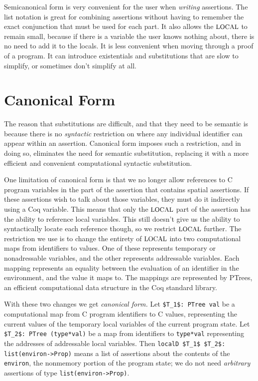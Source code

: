 \documentclass{puthesis}
\begin{document}
Semicanonical form is very convenient for the user when
\emph{writing} assertions. The list notation is great for combining
assertions without having to remember the exact conjunction that must
be used for each part. It also allows the $\mbox{\small LOCAL}$ to remain small,
because if there is a variable the user knows nothing about, there is
no need to add it to the locals. It is less convenient when moving
through a proof of a program. It can introduce existentials and
substitutions that are slow to simplify, or sometimes don't simplify
at all.


\section{Canonical Form}
\label{sec:cform}
The reason that substitutions are difficult, and that they need to be
semantic is because there is no \emph{syntactic} restriction on where
any individual identifier can appear within an assertion.  Canonical
form imposes such a restriction, and in doing so, eliminates the need
for semantic substitution, replacing it with a more efficient and
convenient computational syntactic substitution.

One limitation of canonical form is that we no longer allow references
to C program variables in the part of the assertion that contains
spatial assertions. If these assertions wish to talk about those
variables, they must do it indirectly using a Coq variable.  This
means that only the $\mbox{\small LOCAL}$ part of the assertion has the ability to
reference local variables. This still doesn't give us the ability to
syntactically locate each reference though, so we restrict $\mbox{\small LOCAL}$
further. The restriction we use is to change the entirety of $\mbox{\small LOCAL}$
into two computational maps from identifiers to values.  One of these
represents temporary or nonadressable variables, and the other
represents addressable variables. Each mapping represents an equality
between the evaluation of an identifier in the environment, and the
value it maps to. The mappings are represented by PTrees, an efficient
computational data structure in the Coq standard library.

With these two changes we get \emph{canonical form.}  Let
\lstinline{$T_1$: PTree val} be a computational map from C program
identifiers to C values, representing the current values of the
temporary local variables of the current program state. Let
\lstinline{$T_2$: PTree (type*val)} be a map from identifiers to
\lstinline{type*val} representing the addresses of addressable local
variables.  Then \lstinline{localD $T_1$ $T_2$: list(environ->Prop)}
means a list of assertions about the contents of the
\lstinline{environ}, the nonmemory portion of the program state; we do
not need \emph{arbitrary} assertions of type
\lstinline{list(environ->Prop)}.
\end{document}
